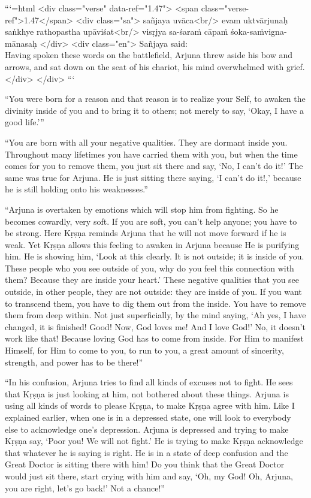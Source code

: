 ```{=html}
<div class="verse" data-ref="1.47">
  <span class="verse-ref">1.47</span>
  <div class="sa">
    sañjaya uvāca<br/>
    evam uktvārjunaḥ saṅkhye rathopastha upāviśat<br/>
    visṛjya sa-śaraṁ cāpaṁ śoka-saṁvigna-mānasaḥ
  </div>
  <div class="en">
    \hspace*{1em}Sañjaya said: \\ Having spoken these words on the battlefield, Arjuna threw aside his bow and arrows, and sat down on the seat of his chariot, his mind overwhelmed with grief.
  </div>
</div>
```


\enquote{You were born for a reason and that reason is to realize your Self, to awaken the divinity inside of you and to bring it to others; not merely to say, \enquote{Okay, I have a good life.}}

\enquote{You are born with all your negative qualities. They are dormant inside you. Throughout many lifetimes you have carried them with you, but when the time comes for you to remove them, you just sit there and say, \enquote{No, I can’t do it!} The same was true for Arjuna. He is just sitting there saying, \enquote{I can’t do it!,} because he is still holding onto his weaknesses.}

\enquote{Arjuna is overtaken by emotions which will stop him from fighting. So he becomes cowardly, very soft. If you are soft, you can’t help anyone; you have to be strong. Here Kṛṣṇa reminds Arjuna that he will not move forward if he is weak. Yet Kṛṣṇa allows this feeling to awaken in Arjuna because He is purifying him. He is showing him, \enquote{Look at this clearly. It is not outside; it is inside of you. These people who you see outside of you, why do you feel this connection with them? Because they are inside your heart.} These negative qualities that you see outside, in other people, they are not outside: they are inside of you. If you want to transcend them, you have to dig them out from the inside. You have to remove them from deep within. Not just superficially, by the mind saying, \enquote{Ah yes, I have changed, it is finished! Good! Now, God loves me! And I love God!} No, it doesn’t work like that! Because loving God has to come from inside. For Him to manifest Himself, for Him to come to you, to run to you, a great amount of sincerity, strength, and power has to be there!}

\enquote{In his confusion, Arjuna tries to find all kinds of excuses not to fight. He sees that Kṛṣṇa is just looking at him, not bothered about these things. Arjuna is using all kinds of words to please Kṛṣṇa, to make Kṛṣṇa agree with him. Like I explained earlier, when one is in a depressed state, one will look to everybody else to acknowledge one’s depression. Arjuna is depressed and trying to make Kṛṣṇa say, \enquote{Poor you! We will not fight.} He is trying to make Kṛṣṇa acknowledge that whatever he is saying is right. He is in a state of deep confusion and the Great Doctor is sitting there with him! Do you think that the Great Doctor would just sit there, start crying with him and say, \enquote{Oh, my God! Oh, Arjuna, you are right, let’s go back!} Not a chance!}

